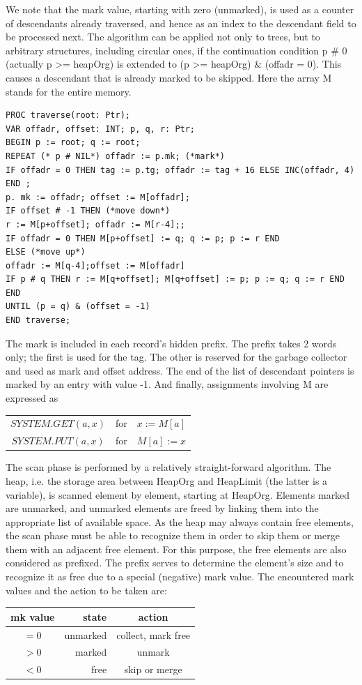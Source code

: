 We note that the mark value, starting with zero (unmarked), is used as a counter of descendants
already traversed, and hence as an index to the descendant field to be processed next. The
algorithm can be applied not only to trees, but to arbitrary structures, including circular ones, if the
continuation condition p \# 0 (actually p >= heapOrg) is extended to (p >= heapOrg) \& (offadr = 0).
This causes a descendant that is already marked to be skipped. Here the array M stands for the
entire memory.
\begin{verbatim}
PROC traverse(root: Ptr);
VAR offadr, offset: INT; p, q, r: Ptr;
BEGIN p := root; q := root;
REPEAT (* p # NIL*) offadr := p.mk; (*mark*)
IF offadr = 0 THEN tag := p.tg; offadr := tag + 16 ELSE INC(offadr, 4) END ;
p. mk := offadr; offset := M[offadr];
IF offset # -1 THEN (*move down*)
r := M[p+offset]; offadr := M[r-4];;
IF offadr = 0 THEN M[p+offset] := q; q := p; p := r END
ELSE (*move up*)
offadr := M[q-4];offset := M[offadr]
IF p # q THEN r := M[q+offset]; M[q+offset] := p; p := q; q := r END
END
UNTIL (p = q) & (offset = -1)
END traverse;
\end{verbatim}

The mark is included in each record's hidden prefix. The prefix takes 2 words only; the first is used
for the tag. The other is reserved for the garbage collector and used as mark and offset address.
The end of the list of descendant pointers is marked by an entry with value -1. And finally,
assignments involving M are expressed as
\begin{table}[h!]
	\centering
	\begin{tabular}{c c c}
		$SYSTEM.GET(a, x)$ & for & $x := M[a]$ \\
		$SYSTEM.PUT(a, x)$ & for & $M[a] := x$ \\
	\end{tabular}
\end{table}

The scan phase is performed by a relatively straight-forward algorithm. The heap, i.e. the storage
area between HeapOrg and HeapLimit (the latter is a variable), is scanned element by element,
starting at HeapOrg. Elements marked are unmarked, and unmarked elements are freed by linking
them into the appropriate list of available space.
As the heap may always contain free elements, the scan phase must be able to recognize them in
order to skip them or merge them with an adjacent free element. For this purpose, the free
elements are also considered as prefixed. The prefix serves to determine the element's size and to
recognize it as free due to a special (negative) mark value. The encountered mark values and the
action to be taken are:
\begin{table}[h!]
	\centering
	\begin{tabular}{c r c}
		mk value &  state   & action \\\hline
		$=0$     & unmarked & collect, mark free \\
		$>0$     &   marked & unmark \\
		$<0$     &     free & skip or merge
	\end{tabular}
\end{table}

